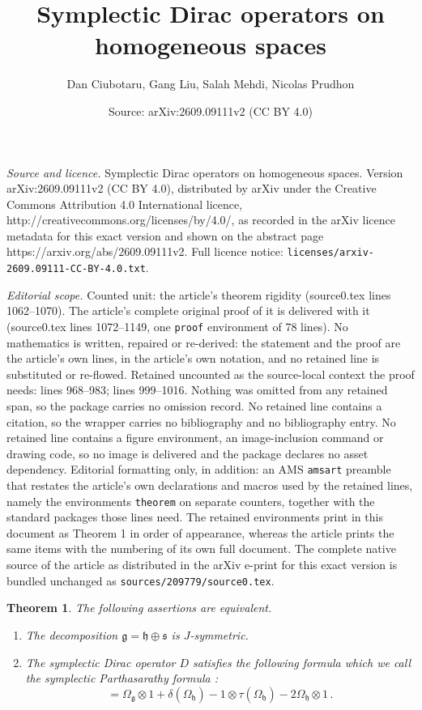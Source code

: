 \documentclass[10pt,a4paper]{amsart}
\title{Symplectic Dirac operators on homogeneous spaces}
\author{Dan Ciubotaru, Gang Liu, Salah Mehdi, Nicolas Prudhon}
\date{Source: arXiv:2609.09111v2 (CC BY 4.0)}
\newtheorem{theorem}{Theorem}
\newcommand{\mg}{\mathfrak{g}}
\newcommand{\mh}{\mathfrak{h}}
\newcommand{\ms}{\mathfrak{s}}
\begin{document}
\maketitle

\noindent\emph{Source and licence.} Symplectic Dirac operators on homogeneous spaces. Version arXiv:2609.09111v2 (CC BY 4.0), distributed by arXiv under the Creative Commons Attribution 4.0 International licence, http://creativecommons.org/licenses/by/4.0/, as recorded in the arXiv licence metadata for this exact version and shown on the abstract page https://arxiv.org/abs/2609.09111v2. Full licence notice: \texttt{licenses/arxiv-2609.09111-CC-BY-4.0.txt}.\par\smallskip

\noindent\textit{Editorial scope.} Counted unit: the article's theorem rigidity (source0.tex lines 1062--1070). The article's complete original proof of it is delivered with it (source0.tex lines 1072--1149, one \texttt{proof} environment of 78 lines). No mathematics is written, repaired or re-derived: the statement and the proof are the article's own lines, in the article's own notation, and no retained line is substituted or re-flowed.  Retained uncounted as the source-local context the proof needs: lines 968--983; lines 999--1016.  Nothing was omitted from any retained span, so the package carries no omission record.  No retained line contains a citation, so the wrapper carries no bibliography and no bibliography entry.  No retained line contains a figure environment, an image-inclusion command or drawing code, so no image is delivered and the package declares no asset dependency.  Editorial formatting only, in addition: an AMS \texttt{amsart} preamble that restates the article's own declarations and macros used by the retained lines, namely the environments \texttt{theorem} on separate counters, together with the standard packages those lines need.  The retained environments print in this document as Theorem 1 in order of appearance, whereas the article prints the same items with the numbering of its own full document.  The complete native source of the article as distributed in the arXiv e-print for this exact version is bundled unchanged as \texttt{sources/209779/source0.tex}.
\begin{theorem}
\label{Dirac-Parthasarthy}
The following assertions are equivalent.
\begin{enumerate}
\item The decomposition $\mg= \mh \oplus \ms$ 
is $J$-symmetric.
\item The symplectic Dirac operator $D$ satisfies 
the following formula
which we call the \emph{symplectic Parthasarathy formula} :
\begin{equation}
[D^+,D^-]= \Omega_{\mg}\otimes 1 + \delta(\Omega_{\mh})-1\otimes \tau(\Omega_{\mh})- 2\Omega_\mh \otimes 1 \,.
\label{partha}
\end{equation}
\end{enumerate}

\end{theorem}
\end{document}
